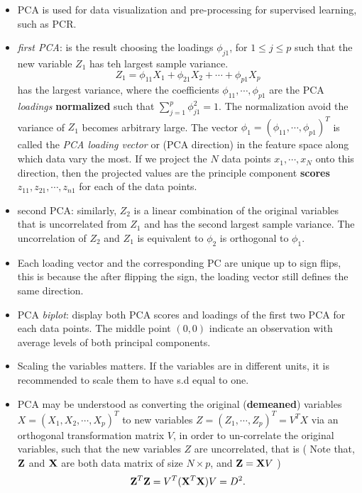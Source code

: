 \documentclass[
  letterpaper,
  DIV=11,
  numbers=noendperiod]{scrreprt}
\begin{document}
\begin{itemize}
\item
  PCA is used for data visualization and pre-processing for supervised
  learning, such as PCR.
\item
  \emph{first PCA}: is the result choosing the loadings \(\phi_{j1}\),
  for \(1\le j \le p\) such that the new variable \(Z_1\) has teh
  largest sample variance. \[
  Z_1 =\phi_{11}X_1 +\phi_{21}X_2+\cdots +\phi_{p1}X_p
  \] has the largest variance, where the coefficients
  \(\phi_{11}, \cdots, \phi_{p1}\) are the PCA \emph{loadings}
  \textbf{normalized} such that \(\sum_{j=1}^p \phi_{j1}^2=1\). The
  normalization avoid the variance of \(Z_1\) becomes arbitrary large.
  The vector \(\phi_1=(\phi_{11}, \cdots, \phi_{p1})^T\) is called the
  \emph{PCA loading vector} or (PCA direction) in the feature space
  along which data vary the most. If we project the \(N\) data points
  \(x_1, \cdots, x_N\) onto this direction, then the projected values
  are the principle component \textbf{scores}
  \(z_{11} , z_{21}, \cdots, z_{n1}\) for each of the data points.
\item
  second PCA: similarly, \(Z_2\) is a linear combination of the original
  variables that is uncorrelated from \(Z_1\) and has the second largest
  sample variance. The uncorrelation of \(Z_2\) and \(Z_1\) is
  equivalent to \(\phi_2\) is orthogonal to \(\phi_1\).
\item
  Each loading vector and the corresponding PC are unique up to sign
  flips, this is because the after flipping the sign, the loading vector
  still defines the same direction.
\item
  PCA \emph{biplot}: display both PCA scores and loadings of the first
  two PCA for each data points. The middle point \((0,0)\) indicate an
  observation with average levels of both principal components.
\item
  Scaling the variables matters. If the variables are in different
  units, it is recommended to scale them to have s.d equal to one.
\item
  PCA may be understood as converting the original (\textbf{demeaned})
  variables \(X=(X_1, X_2, \cdots, X_p)^T\) to new variables
  \(Z=(Z_1, \cdots, Z_p)^T=V^TX\) via an orthogonal transformation
  matrix \(V\), in order to un-correlate the original variables, such
  that the new variables \(Z\) are uncorrelated, that is ( Note that,
  \({\bf Z}\) and \({\bf X}\) are both data matrix of size
  \(N\times p\), and \({\bf Z}={\bf X}V\) ) \[
  {\bf Z}^T{\bf Z} = V^T({\bf X}^T{\bf X})V= D^2. 
\]
\end{itemize}
\end{document}
